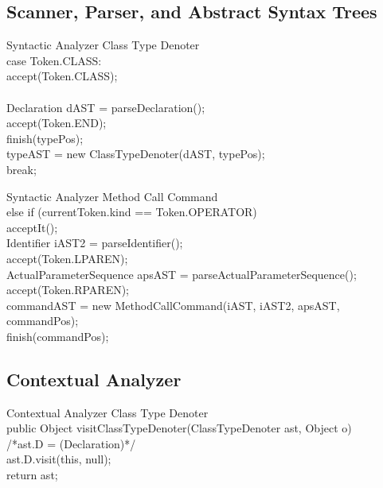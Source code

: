 \documentclass{beamer}
\begin{document}
\subsection{Scanner, Parser, and Abstract Syntax Trees}
\begin{frame}{Syntactic Analyzer}
\alert{Class Type Denoter} \\
case Token.CLASS:\\
    accept(Token.CLASS);\\
\\
    Declaration dAST = parseDeclaration();\\
    accept(Token.END);\\
    finish(typePos);\\
    typeAST = new ClassTypeDenoter(dAST, typePos);\\
  break;
\end{frame}
\begin{frame}{Syntactic Analyzer}
\alert{Method Call Command} \\
else if (currentToken.kind == Token.OPERATOR)\\
    acceptIt();\\
    Identifier iAST2 = parseIdentifier();\\
    accept(Token.LPAREN);\\
    ActualParameterSequence apsAST = parseActualParameterSequence();\\
    accept(Token.RPAREN);\\
    commandAST = new MethodCallCommand(iAST, iAST2, apsAST, commandPos);\\
finish(commandPos);
\end{frame}


\subsection{Contextual Analyzer}
\begin{frame}{Contextual Analyzer}
\alert{Class Type Denoter} \\
public Object visitClassTypeDenoter(ClassTypeDenoter ast, Object o)\\
  /*ast.D = (Declaration)*/\\
  ast.D.visit(this, null);\\
  return ast;
\end{frame}
\end{document}

